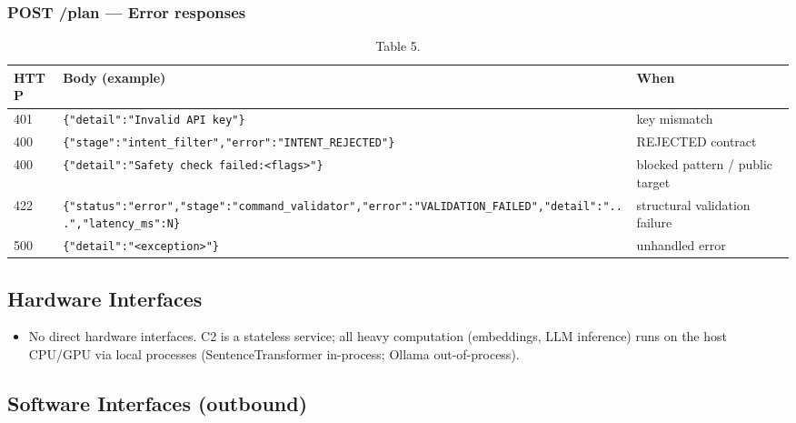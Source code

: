 \documentclass[10pt,journal,onecolumn]{IEEEtran}
\begin{document}
\subsubsection{POST /plan --- Error responses}

\begin{table}[h]
\caption{Table 5.}
\label{tab:t5}
\begin{tabularx}{\columnwidth}{l >{\raggedright\arraybackslash}X >{\raggedright\arraybackslash}X}
\toprule
\textbf{HTTP} & \textbf{Body (example)} & \textbf{When}\\
\midrule
401 & \texttt{\{"detail":\allowbreak  "Invalid API key"\}} & key mismatch\\
400 & \texttt{\{"stage":\allowbreak "intent\_\allowbreak filter","error":\allowbreak "INTENT\_\allowbreak REJECTED"\}} & REJECTED contract\\
400 & \texttt{\{"detail":\allowbreak "Safety check failed:\allowbreak  <flags>"\}} & blocked pattern / public target\\
422 & \texttt{\{"status":\allowbreak "error","stage":\allowbreak "command\_\allowbreak validator","error":\allowbreak "VALIDATION\_\allowbreak FAILED","detail":\allowbreak ".\allowbreak .\allowbreak .\allowbreak ","latency\_\allowbreak ms":\allowbreak N\}} & structural validation failure\\
500 & \texttt{\{"detail":\allowbreak "<exception>"\}} & unhandled error\\
\bottomrule
\end{tabularx}
\end{table}

\subsection{Hardware Interfaces}

\begin{itemize}
\item No direct hardware interfaces. C2 is a stateless service; all heavy computation (embeddings, LLM inference) runs on the host CPU/GPU via local processes (SentenceTransformer in-process; Ollama out-of-process).
\end{itemize}

\subsection{Software Interfaces (outbound)}
\end{document}
